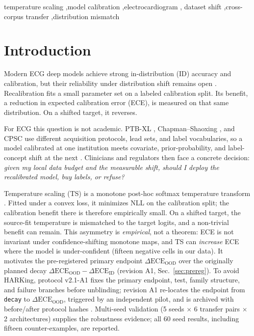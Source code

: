 \documentclass[review,12pt,nonatbib]{elsarticle}
\begin{document}
\begin{frontmatter}
\begin{keyword}
temperature scaling \sep model calibration \sep electrocardiogram \sep
dataset shift \sep cross-corpus transfer \sep distribution mismatch
\end{keyword}

\end{frontmatter}



\section{Introduction}
\label{sec:intro}
Modern ECG deep models achieve strong in-distribution (ID) accuracy and
calibration, but their reliability under distribution shift remains open
\cite{ovadia2019calibration,guo2017calibration,wagner2020ptbxl}.
Recalibration fits a small parameter set on a labeled calibration split.
Its benefit, a reduction in expected calibration error (ECE), is measured
on that same distribution. On a shifted target, it reverses.

For ECG this question is not academic. PTB-XL \cite{wagner2020ptbxl},
Chapman--Shaoxing \cite{zheng2022ecgarrhythmia}, and CPSC use different
acquisition protocols, lead sets, and label vocabularies, so a model
calibrated at one institution meets covariate, prior-probability, and
label-concept shift at the next \cite{morenotorres2012}. Clinicians and
regulators then face a concrete decision: \emph{given my local data budget
and the measurable shift, should I deploy the recalibrated model, buy
labels, or refuse?}

Temperature scaling (TS) is a monotone post-hoc softmax temperature
transform \cite{guo2017calibration}. Fitted under a convex loss, it
minimizes NLL on the calibration split; the calibration benefit there
is therefore empirically small. On a shifted target, the source-fit
temperature is mismatched to the target logits, and a non-trivial
benefit can remain.
This asymmetry is \emph{empirical}, not a theorem: ECE is not invariant
under confidence-shifting monotone maps, and TS can \emph{increase} ECE
where the model is under-confident (fifteen negative cells in our data). It
motivates the pre-registered primary endpoint
$\Delta\text{ECE}_{\text{OOD}}$ over the originally planned decay
$\Delta\text{ECE}_{\text{OOD}}-\Delta\text{ECE}_{\text{ID}}$ (revision A1,
Sec.~\ref{sec:prereg}). To avoid HARKing, protocol v2.1-A1
\cite{protocolv21a1} fixes the primary endpoint, test, family structure,
and failure branches before unblinding; revision A1 re-locates the
endpoint from \texttt{decay} to $\Delta\text{ECE}_{\text{OOD}}$, triggered
by an independent pilot, and is archived with before/after protocol hashes
\cite{nosek2019prereg,lakens2019prereg}. Multi-seed validation
(5 seeds $\times$ 6 transfer pairs $\times$ 2 architectures) supplies the
robustness evidence; all 60 seed results, including fifteen counter-examples,
are reported.
\end{document}
